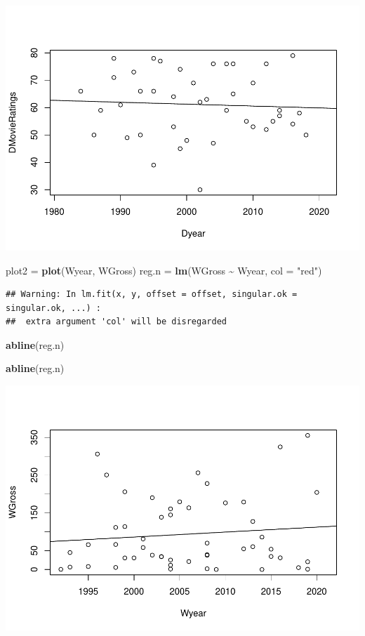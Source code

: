 \documentclass[]{article}
\newenvironment{Shaded}{\begin{snugshade}}{\end{snugshade}}
\newcommand{\DataTypeTok}[1]{\textcolor[rgb]{0.13,0.29,0.53}{#1}}
\newcommand{\KeywordTok}[1]{\textcolor[rgb]{0.13,0.29,0.53}{\textbf{#1}}}
\newcommand{\NormalTok}[1]{#1}
\newcommand{\OperatorTok}[1]{\textcolor[rgb]{0.81,0.36,0.00}{\textbf{#1}}}
\newcommand{\StringTok}[1]{\textcolor[rgb]{0.31,0.60,0.02}{#1}}
\begin{document}
\includegraphics{Denzel-v-Will-data_files/figure-latex/unnamed-chunk-5-6.pdf}

\begin{Shaded}
\begin{Highlighting}[]
\NormalTok{plot2 =}\StringTok{ }\KeywordTok{plot}\NormalTok{(Wyear, WGross)}
\NormalTok{reg.n =}\StringTok{ }\KeywordTok{lm}\NormalTok{(WGross }\OperatorTok{\textasciitilde{}}\StringTok{ }\NormalTok{Wyear, }\DataTypeTok{col =} \StringTok{"red"}\NormalTok{)}
\end{Highlighting}
\end{Shaded}

\begin{verbatim}
## Warning: In lm.fit(x, y, offset = offset, singular.ok = singular.ok, ...) :
##  extra argument 'col' will be disregarded
\end{verbatim}

\begin{Shaded}
\begin{Highlighting}[]
\KeywordTok{abline}\NormalTok{(reg.n)}

\KeywordTok{abline}\NormalTok{(reg.n)}
\end{Highlighting}
\end{Shaded}

\includegraphics{Denzel-v-Will-data_files/figure-latex/unnamed-chunk-5-7.pdf}
\end{document}
